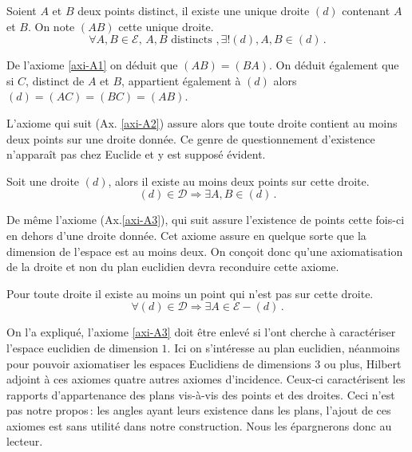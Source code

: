 \begin{axi}\label{axi-A1}
Soient $A$ et $B$ deux points distinct, il existe une unique droite $(d)$ contenant $A$ et $B$. On note $(AB)$ cette unique droite.  
    \begin{equation*}
        \forall A, B \in \mathcal{E},\, A,B \text{ distincts },\exists!(d), A,B\in(d)\,.
    \end{equation*}
\end{axi}
\begin{rema}
    De l'axiome \ref{axi-A1} on déduit que $(AB)=(BA)$. On déduit également que si $C$, distinct de $A$ et $B$, appartient également à $(d)$ alors $(d)=(AC)=(BC)=(AB)$. 
\end{rema}
L'axiome qui suit (Ax. \ref{axi-A2}) assure alors que toute droite contient au moins deux points sur une droite donnée. Ce genre de questionnement d'existence n'apparaît pas chez Euclide et y est supposé évident.
\begin{axi}\label{axi-A2}
    Soit une droite $(d)$, alors il existe au moins deux points sur cette droite.
    \begin{equation*}
        (d)\in\mathcal{D} \Rightarrow \exists A,B\in (d)\,.
    \end{equation*}
\end{axi}
De même l'axiome (Ax.\ref{axi-A3}), qui suit assure l'existence de points cette fois-ci en dehors d'une droite donnée. Cet axiome assure en quelque sorte que la dimension de l'espace est au moins deux. On conçoit donc qu'une axiomatisation de la droite et non du plan euclidien devra reconduire cette axiome. 
\begin{axi}\label{axi-A3}
    Pour toute droite il existe au moins un point qui n'est pas sur cette droite. 
    \begin{equation*}
        \forall (d)\in \mathcal{D}\Rightarrow \exists A\in\mathcal{E}-(d)\,.
    \end{equation*}
\end{axi}
On l'a expliqué, l'axiome \ref{axi-A3} doit être enlevé si l'ont cherche à caractériser l'espace euclidien de dimension $1$. Ici on s'intéresse au plan euclidien, néanmoins pour pouvoir axiomatiser les espaces Euclidiens de dimensions $3$ ou plus, Hilbert adjoint à ces axiomes quatre autres axiomes d'incidence. Ceux-ci caractérisent les rapports d'appartenance des plans vis-à-vis des points et des droites. Ceci n'est pas notre propos\,: les angles ayant leurs existence dans les plans, l'ajout de ces axiomes est sans utilité dans notre construction. Nous les épargnerons donc au lecteur.
     
